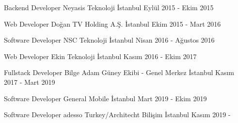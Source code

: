 
\begin{cventries}

    \cventry
        {Backend Developer}
        {Neyasis Teknoloji}
        {İstanbul}
        {Eylül 2015 - Ekim 2015}
        {
        \begin{cvitems}
        \end{cvitems}
        }
        
        \cventry
        {Web Developer}
        {Doğan TV Holding A.Ş.}
        {İstanbul}
        {Ekim 2015 - Mart 2016}{}
        
        \cventry
        {Software Developer}
        {NSC Teknoloji}
        {İstanbul}
        {Nisan 2016 - Ağustos 2016}{}

        \cventry
        {Web Developer}
        {Ekin Teknoloji}
        {İstanbul}
        {Kasım 2016 - Ekim 2017}
        {}

        \cventry
        {Fullstack Developer}
        {Bilge Adam Güney Ekibi - Genel Merkez}
        {İstanbul}
        {Kasım 2017 - Mart 2019}
        {}

        \cventry
        {Software Developer}
        {General Mobile}
        {İstanbul}
        {Mart 2019 - Ekim 2019}
        {}

        \cventry
        {Software Developer}
        {adesso Turkey/Architecht Bilişim}
        {İstanbul}
        {Kasım 2019 - }
        {}
        
\end{cventries}
